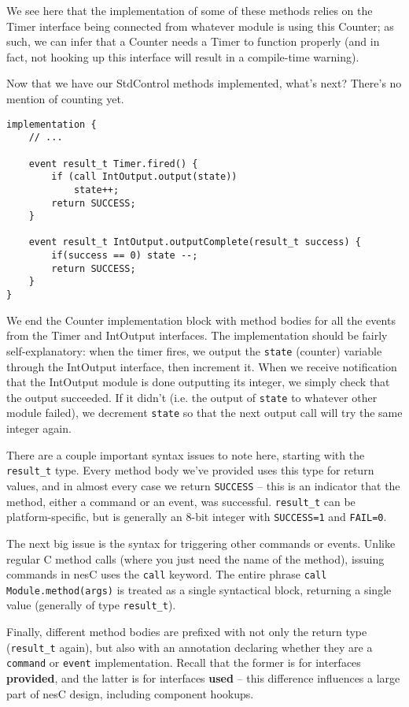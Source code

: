 \documentclass{article}
\begin{document}
We see here that the implementation of some of these methods relies on the Timer interface being connected from whatever module is using this Counter; as such, we can infer that a Counter needs a Timer to function properly (and in fact, not hooking up this interface will result in a compile-time warning).

Now that we have our StdControl methods implemented, what's next? There's no mention of counting yet.

\begin{verbatim}
implementation {
    // ...

    event result_t Timer.fired() {
        if (call IntOutput.output(state))
            state++;
        return SUCCESS;
    }
    
    event result_t IntOutput.outputComplete(result_t success) {
        if(success == 0) state --;
        return SUCCESS;
    }
}
\end{verbatim}

We end the Counter implementation block with method bodies for all the events from the Timer and IntOutput interfaces. The implementation should be fairly self-explanatory: when the timer fires, we output the \verb!state! (counter) variable through the IntOutput interface, then increment it. When we receive notification that the IntOutput module is done outputting its integer, we simply check that the output succeeded. If it didn't (i.e. the output of \verb!state! to whatever other module failed), we decrement \verb!state! so that the next output call will try the same integer again.

There are a couple important syntax issues to note here, starting with the \verb!result_t! type. Every method body we've provided uses this type for return values, and in almost every case we return \verb!SUCCESS! -- this is an indicator that the method, either a command or an event, was successful. \verb!result_t! can be platform-specific, but is generally an 8-bit integer with \verb!SUCCESS=1! and \verb!FAIL=0!.

The next big issue is the syntax for triggering other commands or events. Unlike regular C method calls (where you just need the name of the method), issuing commands in nesC uses the \verb!call! keyword. The entire phrase \verb!call Module.method(args)! is treated as a single syntactical block, returning a single value (generally of type \verb!result_t!).

Finally, different method bodies are prefixed with not only the return type (\verb!result_t! again), but also with an annotation declaring whether they are a \verb!command! or \verb!event! implementation. Recall that the former is for interfaces \textbf{provided}, and the latter is for interfaces \textbf{used} -- this difference influences a large part of nesC design, including component hookups.
\end{document}
